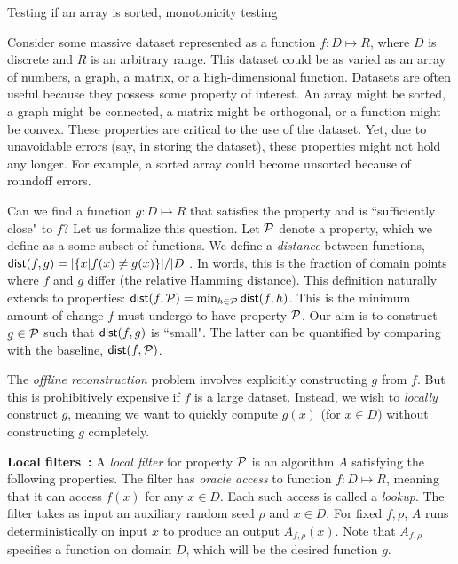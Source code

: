 \documentclass[natbib]{svcyclop}
\def\dist{{\sf dist}}
\begin{document}
\CrossRef

Testing if an array is sorted, monotonicity testing


\ProbDef

Consider some massive dataset represented as a function $f: D \mapsto R$,
where $D$ is discrete and $R$ is an arbitrary range.
This dataset could be as varied as an array of numbers, a graph, a matrix, or a high-dimensional function.
Datasets are often useful because they possess some 
property of interest. An array might be sorted, a graph might be 
connected, a matrix might be orthogonal, or a function might be convex. These properties are critical to the use
of the dataset. Yet, due to unavoidable errors (say, in storing the dataset), these
properties might not hold any longer. For example, a sorted array could become unsorted because of roundoff errors.

Can we find a function $g: D \mapsto R$ that satisfies the property and is ``sufficiently close"
to $f$? Let us formalize this question. Let $\mathcal{P}$ denote a property, which we define as a some subset
of functions. We define a \emph{distance} between functions, $\dist(f,g) = |\{x | f(x) \neq g(x)\}|/|D|$. In words, this is the fraction
of domain points where $f$ and $g$ differ (the relative Hamming distance). This definition naturally extends to properties:
$\dist(f,\cP) = \min_{h \in \cP} \dist(f,h)$. This is the minimum amount of change $f$ must undergo to have property $\mathcal{P}$.
Our aim is to construct $g \in \mathcal{P}$ such that $\dist(f,g)$ is ``small". The latter can be quantified
by comparing with the baseline, $\dist(f,\cP)$.


The \emph{offline reconstruction} problem involves explicitly constructing $g$ from $f$.
But this is prohibitively expensive if $f$ is a large dataset. Instead, we wish to \emph{locally} construct $g$,
meaning we want to quickly compute $g(x)$ (for $x \in D$) without constructing $g$ completely.

{\bf Local filters~\cite{SS06}:} A {\em local filter} for property ${\cal P}$
is an algorithm $A$ satisfying the following properties. The filter 
has \emph{oracle access} to function $f:D \mapsto R$, meaning that it can 
access $f(x)$ for any $x \in D$. Each such access is called a \emph{lookup}.
The filter takes
as input an auxiliary random seed $\rho$ and $x \in D$.  
For fixed $f, \rho$, $A$ runs deterministically on input $x$ to produce an output $A_{f,\rho}(x)$.
Note that $A_{f,\rho}$ specifies a function on domain $D$, which will be the desired function $g$.
\end{document}
